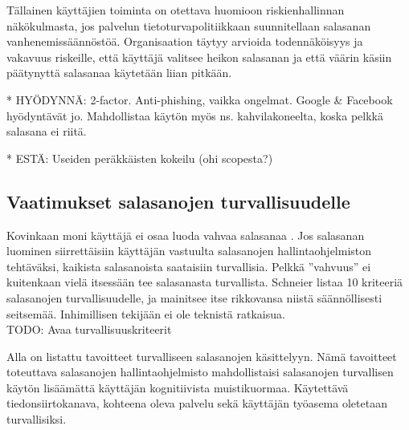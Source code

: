 \documentclass[english,gradu]{tktltiki}
\begin{document}
Tällainen käyttäjien toiminta on otettava huomioon riskienhallinnan näkökulmasta, jos palvelun tietoturvapolitiikkaan suunnitellaan salasanan vanhenemissäännöstöä. Organisaation täytyy arvioida todennäköisyys ja vakavuus riskeille, että käyttäjä valitsee heikon salasanan ja että väärin käsiin päätynyttä salasanaa käytetään liian pitkään.

* HYÖDYNNÄ: 2-factor. Anti-phishing, vaikka ongelmat. Google \& Facebook hyödyntävät jo. Mahdollistaa käytön myös ns. kahvilakoneelta, koska pelkkä salasana ei riitä.

* ESTÄ: Useiden peräkkäisten kokeilu (ohi scopesta?)



\subsection{Vaatimukset salasanojen turvallisuudelle} %
\label{sub:vaatimukset_salasanojen_turvallisuudelle}


         Kovinkaan moni käyttäjä ei osaa luoda vahvaa salasanaa \cite{generating_and_remembering_pws_04, password_management_strategies_06}. Jos salasanan luominen siirrettäisiin käyttäjän vastuulta salasanojen hallintaohjelmiston tehtäväksi, kaikista salasanoista saataisiin turvallisia. Pelkkä ''vahvuus'' ei kuitenkaan vielä itsessään tee salasanasta turvallista.
         Schneier \cite{schneier_password_advice_09} listaa 10 kriteeriä salasanojen turvallisuudelle, ja mainitsee itse rikkovansa niistä säännöllisesti seitsemää. Inhimillisen tekijään ei ole teknistä ratkaisua.
         \\
         TODO: Avaa turvallisuuskriteerit

         Alla on listattu tavoitteet turvalliseen salasanojen käsittelyyn. Nämä tavoitteet toteuttava salasanojen hallintaohjelmisto mahdollistaisi salasanojen turvallisen käytön lisäämättä käyttäjän kognitiivista muistikuormaa. Käytettävä tiedonsiirtokanava, kohteena oleva palvelu sekä käyttäjän työasema oletetaan turvallisiksi.
\end{document}
